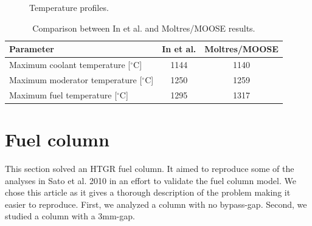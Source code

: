 \begin{figure}[htbp!]
  \centering
  \hfill
  \caption{Temperature profiles.}
  \label{fig:th-val-unit-temps}
\end{figure}

\begin{table}[htbp!]
\centering
    \caption{Comparison between In et al. and Moltres/MOOSE results.}
    \label{tab:th-val-unit-results}
    \begin{tabular}{@{}l c c}
    \toprule
  Parameter                                   & In et al. & Moltres/MOOSE \\
    \midrule
  Maximum coolant temperature [$^{\circ}$C]   & 1144      & 1140    \\
  Maximum moderator temperature [$^{\circ}$C] & 1250      & 1259    \\
  Maximum fuel temperature [$^{\circ}$C]      & 1295      & 1317    \\
    \bottomrule
  \end{tabular}
\end{table}

\section{Fuel column}

This section solved an HTGR fuel column.
It aimed to reproduce some of the analyses in Sato et al. 2010 \cite{sato_computational_2010} in an effort to validate the fuel column model.
We chose this article as it gives a thorough description of the problem making it easier to reproduce.
First, we analyzed a column with no bypass-gap.
Second, we studied a column with a 3mm-gap.


